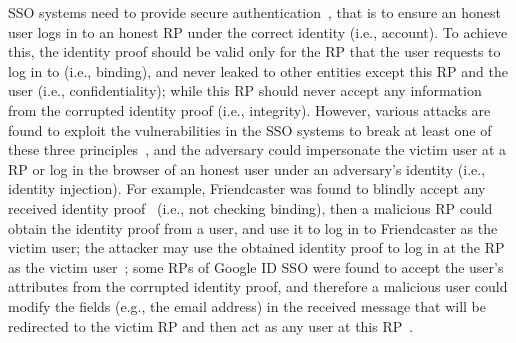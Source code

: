SSO systems need to provide secure authentication~\cite{SPRESSO}, that is to ensure an honest user logs in to an honest RP under the correct identity (i.e., account).
To achieve this, the identity proof should be valid only for the RP that the user requests to log in to (i.e., binding),
  and never leaked to other entities except this RP and the user (i.e., confidentiality);
   while this RP should never accept any information from the corrupted identity proof (i.e., integrity).
However, various attacks are found to exploit the vulnerabilities in the SSO systems to break at least one of these three principles~\cite{ChenPCTKT14, FettKS16,WangCW12,ZhouE14,WangZLG16,YangLLZH16,SomorovskyMSKJ12,MohsenS16}, and the adversary could impersonate the victim user at a RP or log in the browser of an honest user under an adversary’s identity (i.e., identity injection).
For example, Friendcaster was found to blindly accept any received identity proof~\cite{ExplicatingSDK,ChenPCTKT14} (i.e., not checking binding), then a malicious RP could obtain the identity proof from a user, and use it to log in to Friendcaster as the victim user;
the attacker may use the obtained identity proof to log in at the RP as the victim user~\cite{MohsenS16};
some RPs of Google ID SSO were found to accept the user's attributes from the corrupted identity proof, and therefore a malicious user could modify the fields (e.g., the email address) in the received message that will be redirected to the victim RP and then act as any user at this RP~\cite{WangCW12}.

